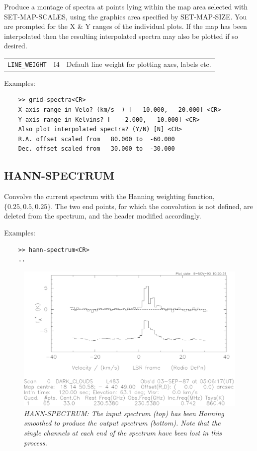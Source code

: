 \documentclass[11pt,twoside]{report}
\begin{document}
Produce a montage of spectra at points lying within the map area selected
with SET-MAP-SCALES, using the graphics area specified by SET-MAP-SIZE.
You are prompted for the X \& Y ranges of the individual plots. If the
map has been interpolated then the resulting interpolated spectra may also
be plotted if so desired.

\begin{tabular}{lll}
  \verb+LINE_WEIGHT+ & I4  & Default line weight for plotting axes,
                             labels etc.
\end{tabular}

Examples:
\begin{verbatim}
    >> grid-spectra<CR>
    X-axis range in Velo? (km/s  ) [  -10.000,   20.000] <CR>
    Y-axis range in Kelvins? [   -2.000,   10.000] <CR>
    Also plot interpolated spectra? (Y/N) [N] <CR>
    R.A. offset scaled from   80.000 to  -60.000
    Dec. offset scaled from   30.000 to  -30.000
\end{verbatim}

\subsection{HANN-SPECTRUM} 

Convolve the current spectrum with the Hanning weighting function,
$\{0.25,0.5,0.25\}$. The two end points, for which the convolution is not
defined, are deleted from the spectrum, and the header modified accordingly.

Examples:
\begin{verbatim}
    >> hann-spectrum<CR>
    ..
\end{verbatim}

\begin{figure}[htbp]
\begin{center}
\includegraphics[scale=0.65]{hann.ps}
\protect\parbox{5.5in}
{\caption[HANN]
{\sl
HANN-SPECTRUM: The input spectrum (top) has been Hanning smoothed to produce
the output spectrum (bottom). Note that the single channels at each end of the
spectrum have been lost in this process.
\label{HANN}
}
}
\end{center}
\end{figure}
\end{document}
